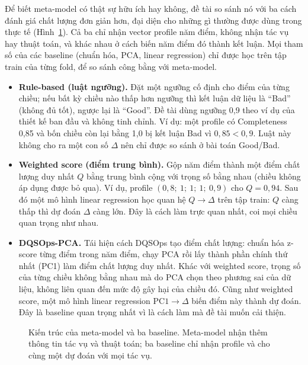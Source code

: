 Để biết meta-model có thật sự hữu ích hay không, đề tài so sánh nó với ba cách đánh giá chất lượng đơn giản hơn, đại diện cho những gì thường được dùng trong thực tế (Hình~\ref{fig:meta}). Cả ba chỉ nhận vector profile năm điểm, không nhận tác vụ hay thuật toán, và khác nhau ở cách biến năm điểm đó thành kết luận. Mọi tham số của các baseline (chuẩn hóa, PCA, linear regression) chỉ được học trên tập train của từng fold, để so sánh công bằng với meta-model.
\begin{itemize}
  \item \textbf{Rule-based (luật ngưỡng).} Đặt một ngưỡng cố định cho điểm của từng chiều; nếu bất kỳ chiều nào thấp hơn ngưỡng thì kết luận dữ liệu là ``Bad'' (không đủ tốt), ngược lại là ``Good''. Đề tài dùng ngưỡng 0,9 theo ví dụ của thiết kế ban đầu và không tinh chỉnh. Ví dụ: một profile có Completeness 0,85 và bốn chiều còn lại bằng 1,0 bị kết luận Bad vì $0{,}85 < 0{,}9$. Luật này không cho ra một con số $\Delta$ nên chỉ được so sánh ở bài toán Good/Bad.
  \item \textbf{Weighted score (điểm trung bình).} Gộp năm điểm thành một điểm chất lượng duy nhất $Q$ bằng trung bình cộng với trọng số bằng nhau (chiều không áp dụng được bỏ qua). Ví dụ, profile $(0{,}8;\ 1;\ 1;\ 1;\ 0{,}9)$ cho $Q = 0{,}94$. Sau đó một mô hình linear regression học quan hệ $Q \to \Delta$ trên tập train: $Q$ càng thấp thì dự đoán $\Delta$ càng lớn. Đây là cách làm trực quan nhất, coi mọi chiều quan trọng như nhau.
  \item \textbf{DQSOps-PCA.} Tái hiện cách DQSOps \citep{bayram2023dqsops} tạo điểm chất lượng: chuẩn hóa z-score từng điểm trong năm điểm, chạy PCA rồi lấy thành phần chính thứ nhất (PC1) làm điểm chất lượng duy nhất. Khác với weighted score, trọng số của từng chiều không bằng nhau mà do PCA chọn theo phương sai của dữ liệu, không liên quan đến mức độ gây hại của chiều đó. Cũng như weighted score, một mô hình linear regression $\text{PC1} \to \Delta$ biến điểm này thành dự đoán. Đây là baseline quan trọng nhất vì là cách làm mà đề tài muốn cải thiện.
\end{itemize}

\begin{figure}[htbp]
\centering
\resizebox{0.62\linewidth}{!}{}
\caption{Kiến trúc của meta-model và ba baseline. Meta-model nhận thêm thông tin tác vụ và thuật toán; ba baseline chỉ nhận profile và cho cùng một dự đoán với mọi tác vụ.}
\label{fig:meta}
\end{figure}

